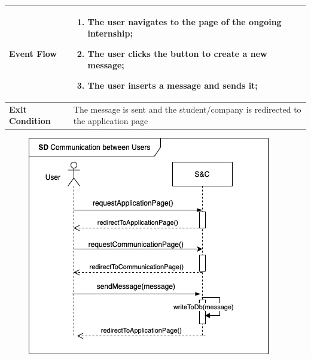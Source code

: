 \begin{enumerate}[label=\textbf{[US\arabic*]}, left = 0pt, align = left, resume]
\begin{longtable}{|l|p{11cm}|}
                \textbf{Event Flow} &
                    \begin{enumerate}[label=\arabic*., itemsep=0.2em]
                        \item The user navigates to the page of the ongoing internship;
                        \item The user clicks the button to create a new message;
                        \item The user inserts a message and sends it; 
                    \end{enumerate} \\
                \hline
                
                \textbf{Exit Condition} & 
                    The message is sent and the student/company is redirected to the application page \\
                \hline
                \hline
            \end{longtable}

            \begin{figure}[h!]
                \centering        \includegraphics{RASD/Images/UseCases/CommunicationBetweenUsers.drawio.png}
                \label{fig:example}
            \end{figure}

        \end{enumerate}

    \newpage
